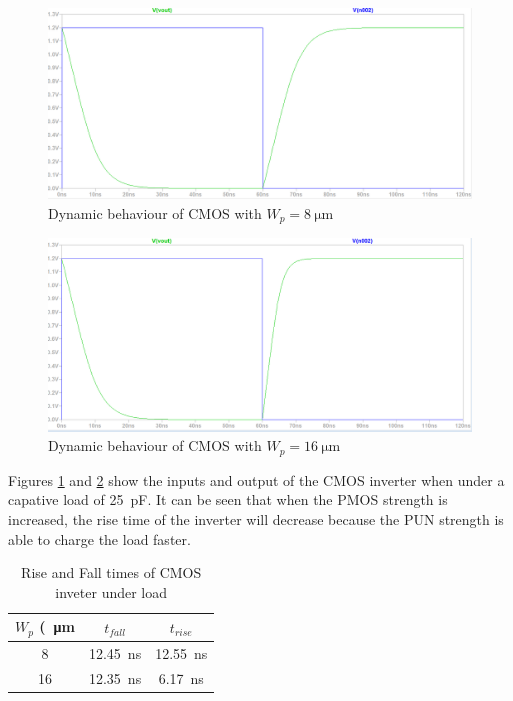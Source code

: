 \documentclass[CMPE]{../KGCOEReport}
\begin{document}
	\begin{figure}[h!]
     	\centering
       \includegraphics[width=5.5in]{img/p5_8u}
       \caption{Dynamic behaviour of CMOS with $W_p = \SI{8}{\micro\metre}$}
       \label{fig:rs_8u}
	 \end{figure}

	\begin{figure}[h!]
     	\centering
       \includegraphics[width=5.5in]{img/p5_16u}
       \caption{Dynamic behaviour of CMOS with $W_p = \SI{16}{\micro\metre}$}
       \label{fig:rs_16u}
	 \end{figure}

	Figures \ref{fig:rs_8u} and \ref{fig:rs_16u} show the inputs and output of the
	CMOS inverter when under a capative load of \SI{25}{\pico\farad}. It can be
	seen that when the PMOS strength is increased, the rise time of the inverter
	will decrease because the PUN strength is able to charge the load faster.


	\begin{table}[h!]
		\renewcommand{\arraystretch}{1.3}
		\setlength{\tabcolsep}{12pt}
		\caption{Rise and Fall times of CMOS inveter under load}
		\begin{center}
		    \begin{tabular}{|c|c|c|}\hline
		    $W_p$ (\SI{}{\micro\metre}
		       & $t_{fall}$ & $t_{rise}$ \\\hline
		    8  & \SI{12.45}{\nano\s} & \SI{12.55}{\nano\s} \\\hline
		    16 & \SI{12.35}{\nano\s} & \SI{6.17}{\nano\s}  \\\hline
		    \end{tabular}
		\end{center}
		\label{tab:p5}
	\end{table}
\end{document}

